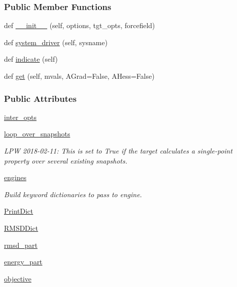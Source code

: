 \subsubsection*{Public Member Functions}
\begin{DoxyCompactItemize}
\item 
def \hyperlink{classsrc_1_1binding_1_1BindingEnergy_ab154e10c3317f8140634bee726d177d6}{\+\_\+\+\_\+init\+\_\+\+\_\+} (self, options, tgt\+\_\+opts, forcefield)
\item 
def \hyperlink{classsrc_1_1binding_1_1BindingEnergy_a9d1c99fadc807e4b04adc249d730483d}{system\+\_\+driver} (self, sysname)
\item 
def \hyperlink{classsrc_1_1binding_1_1BindingEnergy_a21124a9de77db1f3c04d6bdbefcb0b22}{indicate} (self)
\item 
def \hyperlink{classsrc_1_1binding_1_1BindingEnergy_a96467ec6f26522876e04e4782413602a}{get} (self, mvals, A\+Grad=False, A\+Hess=False)
\end{DoxyCompactItemize}
\subsubsection*{Public Attributes}
\begin{DoxyCompactItemize}
\item 
\hyperlink{classsrc_1_1binding_1_1BindingEnergy_a85b7dcbdfbd0331864c07f78336300d0}{inter\+\_\+opts}
\item 
\hyperlink{classsrc_1_1binding_1_1BindingEnergy_a164303ff47ef0a15c7b63add7a56c432}{loop\+\_\+over\+\_\+snapshots}
\begin{DoxyCompactList}\small\item\em L\+PW 2018-\/02-\/11\+: This is set to True if the target calculates a single-\/point property over several existing snapshots. \end{DoxyCompactList}\item 
\hyperlink{classsrc_1_1binding_1_1BindingEnergy_a1d9caef3e11b71a9ff15977cdb324de5}{engines}
\begin{DoxyCompactList}\small\item\em Build keyword dictionaries to pass to engine. \end{DoxyCompactList}\item 
\hyperlink{classsrc_1_1binding_1_1BindingEnergy_a8049a3666453a4bfb50c36788135d0ef}{Print\+Dict}
\item 
\hyperlink{classsrc_1_1binding_1_1BindingEnergy_a3ce83ed981346e4539b5f0450207b64d}{R\+M\+S\+D\+Dict}
\item 
\hyperlink{classsrc_1_1binding_1_1BindingEnergy_a8f13a1550287e4c8b6906dce55c9f364}{rmsd\+\_\+part}
\item 
\hyperlink{classsrc_1_1binding_1_1BindingEnergy_a91083ec8b983abfdc6ae863c69778f92}{energy\+\_\+part}
\item 
\hyperlink{classsrc_1_1binding_1_1BindingEnergy_a90fc3656bbc3b0e1183d8f0c78d84dd9}{objective}
\end{DoxyCompactItemize}


